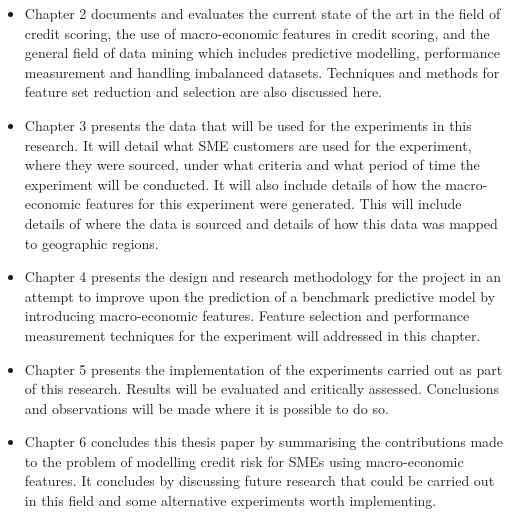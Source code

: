 \begin{itemize}
	
	\item Chapter 2 documents and evaluates the current state of the art in the field of credit scoring, the use of macro-economic features in credit scoring, and the general field of data mining which includes predictive modelling, performance measurement and handling imbalanced datasets. Techniques and methods for feature set reduction and selection are also discussed here. 
	
	\item Chapter 3	presents the data that will be used for the experiments in this research. It will detail what SME customers are used for the experiment, where they were sourced, under what criteria and what period of time the experiment will be conducted. It will also include details of how the macro-economic features for this experiment were generated. This will include details of where the data is sourced and details of how this data was mapped to geographic regions.  
	
	\item Chapter 4 presents the design and research methodology for the project in an attempt to improve upon the prediction of a benchmark predictive model by introducing macro-economic features. Feature selection and performance measurement techniques for the experiment will addressed in this chapter.
	
	\item Chapter 5 presents the implementation of the experiments carried out as part of this research. Results will be evaluated and critically assessed. Conclusions and observations will be made where it is possible to do so. 
	
	\item Chapter 6 concludes this thesis paper by summarising the contributions made to the problem of modelling credit risk for SMEs using macro-economic features. It concludes by discussing future research that could be carried out in this field and some alternative experiments worth implementing.
	
\end{itemize}

